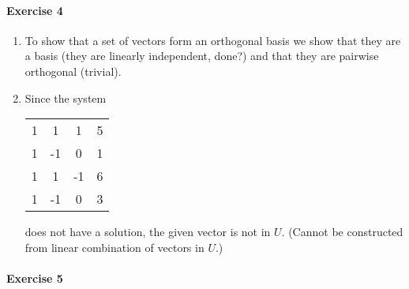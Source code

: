 \documentclass{article}
\begin{document}
\paragraph{Exercise 4}

\begin{enumerate}
    \item To show that a set of vectors form an orthogonal basis we show that they are a basis (they are linearly independent, done?) and that they are pairwise orthogonal (trivial).
    
    \item Since the system
    \begin{center}
        \begin{tabular}{c c c | c}
            1 & 1 & 1 & 5 \\
            1 & -1 & 0 & 1 \\
            1 & 1& -1 & 6 \\
            1 & -1 & 0 & 3 \\
        \end{tabular}
    \end{center}
    does not have a solution, the given vector is not in $U$. (Cannot be constructed from linear combination of vectors in $U$.)

\end{enumerate}

\paragraph{Exercise 5}
\end{document}
